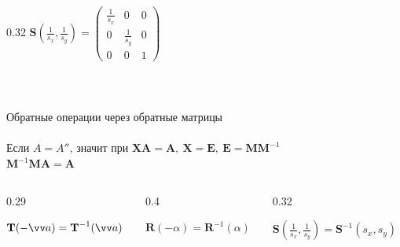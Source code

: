 \documentclass[10pt]{beamer}
\begin{document}
\begin{frame}
\begin{columns}[T]
\begin{column}{0.32\textwidth}
     		$
     		\textbf{S}(\frac{1}{s_x},\frac{1}{s_y})=
     		\begin{pmatrix}
     			\frac{1}{s_x}&0&0\\
     			0&\frac{1}{s_y}&0\\
     			0&0&1
     		\end{pmatrix}
     		$
     	\end{column} 
     	
     
     \end{columns}
     
     
     ~ \\ \pause
     
       \centering
       Обратные операции через обратные матрицы \\ ~ \\
       
       Если $A = A''$, значит при $\textbf{X}\textbf{A}=\textbf{A}, \ \textbf{X}=\textbf{E}, \  \textbf{E}=\textbf{M}\textbf{M}^{-1}$  \\ 
        $
       \textbf{M}^{-1}\textbf{M}\textbf{A}=\textbf{A}
       $
        \pause
       
       \begin{columns}[T]
     	\begin{column}{0.29\textwidth}
     		
		$\textbf{T}(-\vv a )=\textbf{T}^{-1}(\vv a)$
			 
     	\end{column}
     	\begin{column}{0.4\textwidth}
		
		$\textbf{R}(-\alpha )=\textbf{R}^{-1}(\alpha)$
		
     	\end{column}
     	\begin{column}{0.32\textwidth}
      
      	$
      		\textbf{S}(\frac{1}{s_x},\frac{1}{s_y})=\textbf{S}^{-1}(s_x,s_y) 
      	$ 
      	

     	\end{column}
     \end{columns}

\end{frame}

	
\end{document}
